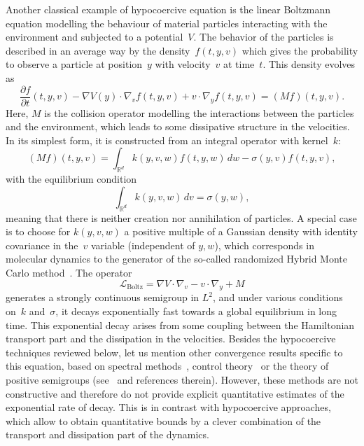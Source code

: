 \documentclass[AHL,Unicode,longabstracts,MathTools,published]{cedram}
\newcommand{\Boltz}{\mathrm{Boltz}}
\newcommand{\cL}{\mathcal{L}}
\newcommand{\R}{\mathbb{R}}
\begin{document}
Another classical example of hypocoercive equation is the linear Boltzmann equation modelling the behaviour of material particles interacting with the environment and subjected to a potential~$V$. The behavior of the particles is described in an average way by the density~$f(t,y,v)$ which gives the probability to observe a particle at position~$y$ with velocity~$v$ at time~$t$. This density evolves as
\begin{equation}\label{eq:Boltzmann_eq}
\frac{\partial f}{\partial t}(t,y,v) - \nabla V(y) \cdot \nabla_v f(t,y,v) + v\cdot\nabla_y f(t,y,v) = (M f)(t,y,v).
\end{equation}
Here, $M$ is the collision operator modelling the interactions between the particles and the environment, which leads to some dissipative structure in the velocities. In its simplest form, it is constructed from an integral operator with kernel~$k$:
\[
(M f)(t,y,v) = \int_{\R^d}k(y,v,w)f(t,y,w) \, dw -\sigma (y,v)f(t,y,v),
\]
with the equilibrium condition
\[
\int_{\R^d}k(y,v,w)\, dv = \sigma (y,w),
\]
meaning that there is neither creation nor annihilation of particles. A special case is to choose for $k(y,v,w)$ a positive multiple of a Gaussian density with identity covariance in the~$v$ variable (independent of $y,w$), which corresponds in molecular dynamics to the generator of the so-called randomized Hybrid Monte Carlo method~\cite{BRSS17}. The operator
\[
\cL_{\Boltz} = \nabla V\cdot \nabla_v-v\cdot\nabla_y + M
\]
generates a strongly continuous semigroup in $L^{2}$, and under various conditions on~$k$ and~$\sigma$, it decays exponentially fast towards a global equilibrium in long time. This exponential decay arises from some coupling between the Hamiltonian transport part and the dissipation in the velocities. Besides the hypocoercive techniques reviewed below, let us mention other convergence results specific to this equation, based on spectral methods~\cite{Ukai74, Vidav70}, control theory~\cite{HKL15} or the theory of positive semigroups (see~\cite{BS13,Mokhtar14} and references therein). However, these methods are not constructive and therefore do not provide explicit quantitative estimates of the exponential rate of decay. This is in contrast with hypocoercive approaches, which allow to obtain quantitative bounds by a clever combination of the transport and dissipation part of the dynamics.
\vspace{20pt}
\pagebreak
\end{document}
